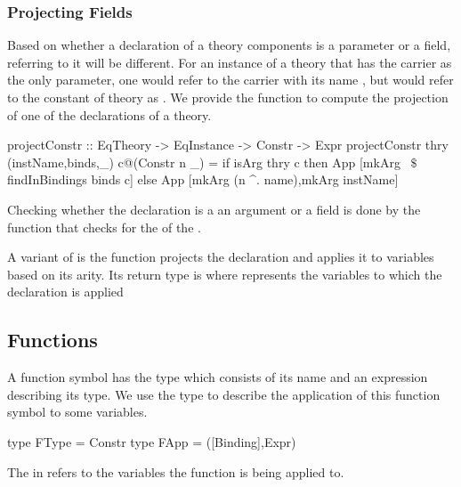 \subsubsection*{Projecting Fields}
Based on whether a declaration of a theory components is a parameter or a field, referring to it will be different. For an instance  of a  theory that has the carrier as the only parameter, one would refer to the carrier with its name , but would refer to the constant  of theory as . 
We provide the function  to compute the projection of one of the declarations of a theory. 
\begin{hscode} 
projectConstr :: EqTheory -> EqInstance -> Constr -> Expr 
projectConstr thry (instName,binds,_) c@(Constr n _)  =
  if isArg thry c then App [mkArg ~$\$$~ findInBindings binds c]
  else App [mkArg (n ^. name),mkArg instName]
\end{hscode}  
\noindent Checking whether the declaration is a an argument or a field is done by the function  that checks for the  of the . 

A variant of  is the function  projects the declaration and applies it to variables based on its arity. Its return type is  where \lstmath{[Binding]} represents the variables to which the declaration is applied  


\subsection{Functions}
\label{subsec:generation:functions}
A function symbol has the type  which consists of its name and an expression describing its type. We use the type  to describe the application of this function symbol to some variables.
\begin{hscode}
type FType = Constr
type FApp = ([Binding],Expr)
\end{hscode}
\noindent The \lstmath{[Binding]} in  refers to the variables the function is being applied to. 

